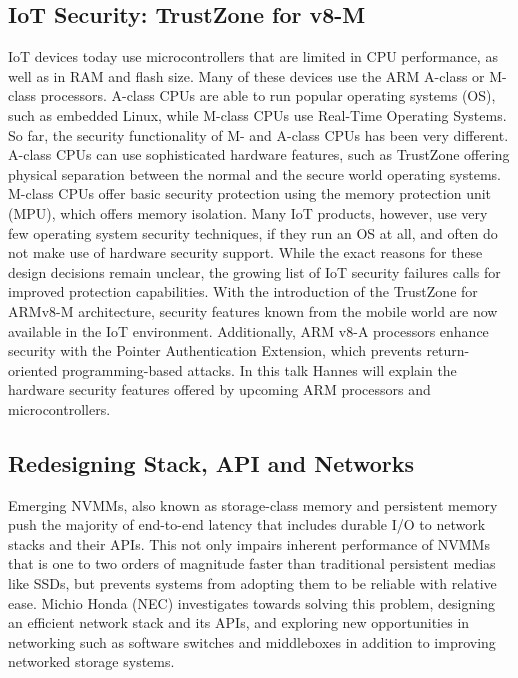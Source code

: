 \subsection{IoT Security: TrustZone for v8-M}

\ac{IoT} devices today use microcontrollers that are limited in CPU
performance, as well as in RAM and flash size. Many of these devices use the
ARM A-class or M-class processors. A-class CPUs are able to run popular
operating systems (OS), such as embedded Linux, while M-class CPUs use
Real-Time Operating Systems. So far, the security functionality of M- and
A-class CPUs has been very different.  A-class CPUs can use sophisticated
hardware features, such as TrustZone offering physical separation between the
normal and the secure world operating systems. M-class CPUs offer basic
security protection using the memory protection unit (MPU), which offers
memory isolation.  Many IoT products, however, use very few operating system
security techniques, if they run an OS at all, and often do not make use of
hardware security support. While the exact reasons for these design decisions
remain unclear, the growing list of IoT security failures calls for improved
protection capabilities.  With the introduction of the TrustZone for ARMv8-M
architecture, security features known from the mobile world are now available
in the \ac{IoT} environment. Additionally, ARM v8-A processors  enhance
security with the Pointer Authentication Extension, which prevents
return-oriented programming-based attacks.  In this talk Hannes will explain
the hardware security features offered by upcoming ARM processors and
microcontrollers.

\subsection{Redesigning Stack, API and Networks} \label{mhonda}

Emerging \ac{NVMMs}, also known as storage-class memory and persistent memory
push the majority of end-to-end latency that includes durable I/O to network
stacks and their APIs.  This not only impairs inherent performance of
\ac{NVMMs} that is one to two orders of magnitude faster than traditional
persistent medias like \ac{SSDs}, but prevents systems from adopting them to
be reliable with relative ease. Michio Honda (NEC) investigates towards
solving this problem, designing an efficient network stack and its APIs, and
exploring new opportunities in networking such as software switches and
middleboxes in addition to improving networked storage systems.


